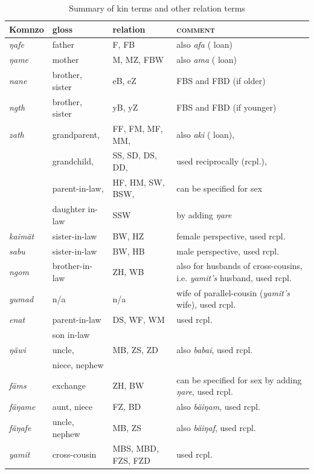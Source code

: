 \renewcommand{\tabcolsep}{2,3pt}
\begin{table}
\caption{Summary of kin terms and other relation terms}
\label{kintermstable}
	\begin{tabularx}{\textwidth}{llp{3cm}Q}
		\lsptoprule
			{Komnzo} & {gloss}&{relation} & \textsc{comment}\\\midrule
			\emph{ŋafe} & father & F, FB & also \emph{afa} ( loan)\\
			\emph{ŋame} & mother & M, MZ, FBW & also \emph{ama} ( loan)\\
			\emph{nane} & brother, sister & eB, eZ & FBS and FBD (if older)\\
			\emph{ngth} & brother, sister & yB, yZ & FBS and FBD (if younger)\\
			\emph{zath} & grandparent,&FF, FM, MF, MM, & also \emph{aki} ( loan),\\
			&grandchild,&SS, SD, DS, DD, &used reciprocally (rcpl.), \\
			&parent-in-law,&HF, HM, SW, BSW, &can be specified for sex\\
			&daughter in-law&SSW &by adding \emph{ŋare}\\
			\emph{kaimät} & sister-in-law & BW, HZ & female perspective, used rcpl.\\
			\emph{sabu} & sister-in-law & BW, HB & male perspective, used rcpl.\\
			\emph{ngom} & brother-in-law & ZH, WB & also for husbands of cross-cousins, i.e. \emph{yamit's} husband, used rcpl.\\
			\emph{yumad} & n/a & n/a & wife of parallel-cousin (\emph{yamit's} wife), used rcpl.\\
			\emph{enat} &parent-in-law& DS, WF, WM&used rcpl.\\
			&son in-law&&\\
			\emph{ŋäwi} & uncle,& MB, ZS, ZD	& also \emph{babai}, used rcpl.\\
			&niece, nephew&&\\
			\emph{fäms} & exchange	& ZH, BW & can be specified for sex by adding \emph{ŋare}, used rcpl.\\
			\emph{fäŋame} & aunt, niece & FZ, BD&also \emph{bäiŋam}, used rcpl.\\
			\emph{fäŋafe} & uncle, nephew & MB, ZS&also \emph{bäiŋaf}, used rcpl.\\
			\emph{yamit} & cross-cousin & MBS, MBD, FZS, FZD & used rcpl.\\

\end{tabularx}
\end{table}
